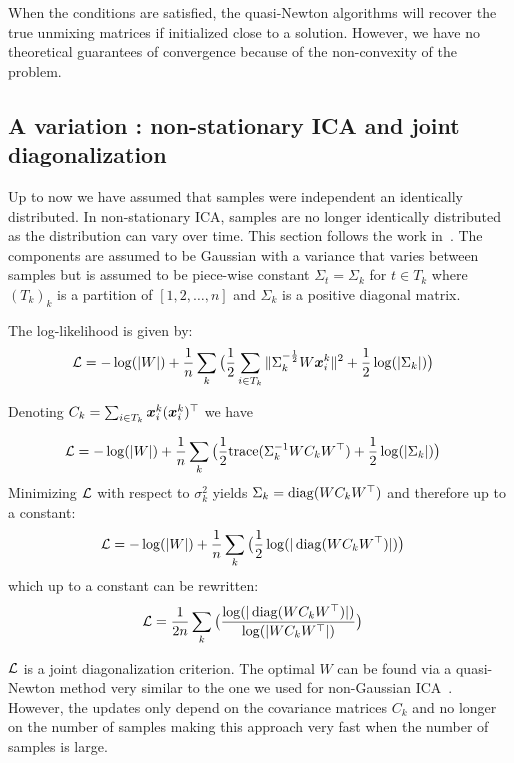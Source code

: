 When the conditions are satisfied, the quasi-Newton algorithms will recover the
true unmixing matrices if initialized close to a solution. However, we have no
theoretical guarantees of convergence because of the non-convexity of the problem.

\subsection{A variation : non-stationary ICA and joint diagonalization}
Up to now we have assumed that samples were independent an identically distributed. In non-stationary ICA, samples are no longer identically distributed as the distribution can vary over time.
This section follows the work in~\cite{pham2001blind}.
The components are assumed to be Gaussian with a variance that varies between
samples but is assumed to be piece-wise constant $\Sigma_t = \Sigma_k$ for $t \in
T_k$ where $(T_k)_k$ is a partition of $[1, 2, \dots, n]$ and $\Sigma_k$ is a
positive diagonal matrix.

The log-likelihood is given by:
\begin{align}  
  \mathcal{L} &= -\log(|W|)  + \frac1{n} \sum_k \big( \frac12 \sum_{i \in T_k}\|\Sigma_k^{-\frac12} W \boldsymbol{x}^k_i \|^2 + \frac12 \log(|\Sigma_k|) \big)
\end{align}

Denoting $C_k = \sum_{i \in T_k} \boldsymbol{x}_i^k (\boldsymbol{x}_i^k)^{\top}$ we have 

\begin{align}  
  \mathcal{L} &= -\log(|W|)  + \frac1{n} \sum_k \big( \frac1{2} {\mathrm{ trace}}(\Sigma_k^{-1} W C_k W^{\top}) + \frac12 \log(|\Sigma_k|) \big)
\end{align}
Minimizing $\mathcal{L}$ with respect to $\sigma_k^2$ yields $\Sigma_k = \operatorname*{diag}(W C_k
W^{\top})$ and therefore up to a constant:
\begin{align}  
  \mathcal{L} &= -\log(|W|)  + \frac1{n} \sum_k \big(\frac12 \log(|\operatorname*{diag}(W C_k W^{\top})|) \big)
\end{align}
which up to a constant can be rewritten:
\begin{align}  
  \mathcal{L} &=\frac1{2n} \sum_k \big(\frac{\log(|\operatorname*{diag}(W C_k W^{\top})|)}{\log(|W C_k W^{\top}|)} \big)
\end{align}

$\mathcal{L}$ is a joint diagonalization criterion. The optimal $W$ can be found via a
quasi-Newton method very similar to the one we used for non-Gaussian
ICA~\cite{ablin2018beyond}. However, the updates only depend on the covariance
matrices $C_k$ and no longer on the number of samples making this approach very
fast when the number of samples is large.

